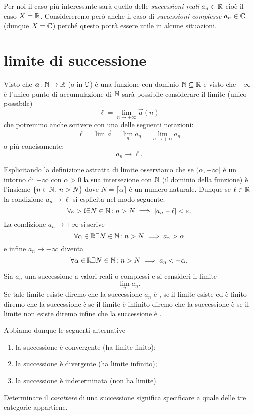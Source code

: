 Per noi il caso più interessante sarà quello delle \emph{successioni reali}
$a_n\in \mathbb R$ cioè il caso $X=\mathbb R$. Considereremo però anche il caso di
\emph{successioni complesse} $a_n\in \mathbb C$ (dunque $X=\mathbb C$) perché questo
potrà essere utile in alcune situazioni.


\section{limite di successione}

Visto che $\boldsymbol a \colon \mathbb N\to\mathbb R$ (o in $\mathbb C$) è una funzione 
con dominio $\mathbb N\subseteq \mathbb R$ 
e visto che $+\infty$ è l'unico punto di accumulazione di $\mathbb N$ 
sarà possibile considerare il limite (unico possibile)
\[
  \ell = \lim_{n\to +\infty} \vec a(n)
\]
che potremmo anche scrivere con una delle seguenti notazioni:
\[
\ell = \lim \vec a = \lim_n a_n = \lim_{n\to +\infty} a_n
\]
o più concisamente:
\[
  a_n \to \ell. 
\]

Esplicitando la definizione astratta di limite osserviamo che se $(\alpha,+\infty]$
è un intorno di $+\infty$ con $\alpha>0$ la sua intersezione con $\mathbb N$ (il dominio della funzione)
è l'insieme ${\left\{ n\in \mathbb N\colon n> N \right\}}$ dove $N=\lceil \alpha \rceil$ è 
un numero naturale. Dunque se $\ell \in \mathbb R$ 
la condizione $a_n \to \ell$ si esplicita nel modo seguente:
\begin{equation}\label{eq:limite_successione_convergente}
\forall \varepsilon>0 \exists N\in \mathbb N\colon n>N\implies {\left|a_n-\ell\right|} < \varepsilon.  
\end{equation}
La condizione $a_n\to +\infty$ si scrive
\[
  \forall \alpha\in \mathbb R \exists N\in \mathbb N \colon n>N \implies a_n > \alpha  
\]
e infine $a_n\to-\infty$ diventa
\[
  \forall \alpha\in \mathbb R \exists N\in \mathbb N \colon n>N \implies a_n < -\alpha.    
\]

\begin{definition}
Sia $a_n$ una successione a valori reali o complessi
e si consideri il limite 
\[
  \lim_n a_n.  
\]
Se tale limite esiste diremo che la successione $a_n$ è 
,
%
se il limite esiste ed è finito diremo che la successione è 
%
se il limite è infinito diremo che la successione è 
%
se il limite non esiste diremo infine che la successione è
%
.

Abbiamo dunque le seguenti alternative
\begin{enumerate}
 \item la successione è convergente (ha limite finito);
 \item la successione è divergente (ha limite infinito);
 \item la successione è indeterminata (non ha limite).
\end{enumerate}
Determinare il \emph{carattere}
%
%
%
di una successione
significa specificare a quale delle tre categorie appartiene.
\end{definition}

